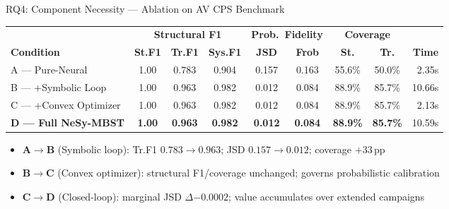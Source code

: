 \documentclass[aspectratio=169,10pt]{beamer}
\newcommand{\pos}[1]{\textcolor{positive}{#1}}
\begin{document}
\begin{frame}{RQ4: Component Necessity — Ablation on AV CPS Benchmark}
  \vspace{0.2em}
  \begin{center}
  \scriptsize
  \begin{tabular}{l ccc cc cc r}
    \toprule
    & \multicolumn{3}{c}{\textbf{Structural F1}} & \multicolumn{2}{c}{\textbf{Prob.\ Fidelity}} & \multicolumn{2}{c}{\textbf{Coverage}} & \\
    \cmidrule(lr){2-4}\cmidrule(lr){5-6}\cmidrule(lr){7-8}
    \textbf{Condition} & \textbf{St.F1} & \textbf{Tr.F1} & \textbf{Sys.F1} & \textbf{JSD} & \textbf{Frob} & \textbf{St.} & \textbf{Tr.} & \textbf{Time} \\
    \midrule
    A — Pure-Neural           & 1.00 & 0.783 & 0.904 & 0.157 & 0.163 & 55.6\% & 50.0\% & 2.35s \\
    B — +Symbolic Loop        & 1.00 & \pos{0.963} & \pos{0.982} & \pos{0.012} & \pos{0.084} & \pos{88.9\%} & \pos{85.7\%} & 10.66s \\
    C — +Convex Optimizer     & 1.00 & 0.963 & 0.982 & 0.012 & 0.084 & 88.9\% & 85.7\% & 2.13s \\
    \textbf{D — Full NeSy-MBST} & \textbf{1.00} & \textbf{0.963} & \textbf{0.982} & \textbf{0.012} & \textbf{0.084} & \textbf{88.9\%} & \textbf{85.7\%} & 10.59s \\
    \bottomrule
  \end{tabular}
  \end{center}
  \vspace{0.3em}
  \begin{itemize}
    \item \textbf{A$\to$B} (\pos{Symbolic loop}): Tr.F1 $0.783 \to 0.963$; JSD $0.157 \to 0.012$; coverage $+33\,$pp
    \item \textbf{B$\to$C} (\pos{Convex optimizer}): structural F1/coverage unchanged; governs probabilistic calibration
    \item \textbf{C$\to$D} (Closed-loop): marginal JSD $\Delta{-0.0002}$; value accumulates over extended campaigns
  \end{itemize}
\end{frame}
\end{document}
